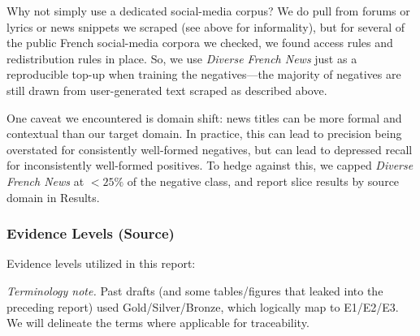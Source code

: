 \documentclass[12pt]{article}
\begin{document}
Why not simply use a dedicated social-media corpus? We do pull from forums or lyrics or news snippets we scraped (see above for informality), but for several of the public French social-media corpora we checked, we found access rules and redistribution rules in place. So, we use \textit{Diverse French News} just as a reproducible top-up when training the negatives—the majority of negatives are still drawn from user-generated text scraped as described above.

One caveat we encountered is domain shift: news titles can be more formal and contextual than our target domain. In practice, this can lead to precision being overstated for consistently well-formed negatives, but can lead to depressed recall for inconsistently well-formed positives. To hedge against this, we capped \textit{Diverse French News} at \(<25\%\) of the negative class, and report slice results by source domain in Results.

\subsubsection{Evidence Levels (Source)}

Evidence levels utilized in this report:

\begin{table}[H]
\centering
\caption{Evidence levels applied across the verlan dataset.}
\label{tab:verlan_tiers}
\end{table}

\noindent \textit{Terminology note.} Past drafts (and some tables/figures that leaked into the preceding report) used Gold/Silver/Bronze, which logically map to E1/E2/E3. We will delineate the terms where applicable for traceability.
\end{document}
